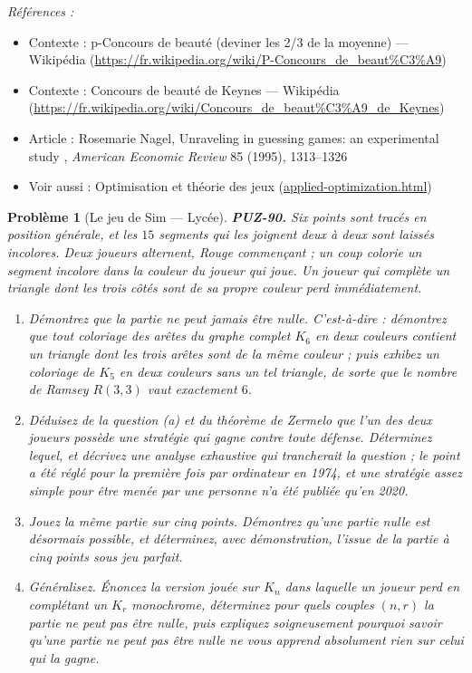 \documentclass[11pt]{article}
\newtheorem{problem}{Problème}
\newenvironment{refs}{\par\small\noindent\emph{Références :}\begin{itemize}\setlength\itemsep{0pt}}{\end{itemize}\normalsize}
\begin{document}
\begin{refs}
\item Contexte : p-Concours de beauté (deviner les 2/3 de la moyenne) --- Wikipédia (\url{https://fr.wikipedia.org/wiki/P-Concours_de_beaut%C3%A9})
\item Contexte : Concours de beauté de Keynes --- Wikipédia (\url{https://fr.wikipedia.org/wiki/Concours_de_beaut%C3%A9_de_Keynes})
\item Article : Rosemarie Nagel, \og{} Unraveling in guessing games: an experimental study \fg{}, \textit{American Economic Review} 85 (1995), 1313--1326
\item Voir aussi : Optimisation et théorie des jeux (\url{applied-optimization.html})
\end{refs}

\bigskip

\begin{problem}[{Le jeu de Sim --- Lycée}]
\textbf{PUZ-90.} Six points sont tracés en position générale, et les $ 15 $ segments
qui les joignent deux à deux sont laissés incolores. Deux joueurs alternent, Rouge
commençant ; un coup colorie un segment incolore dans la couleur du joueur qui joue. Un
joueur qui complète un triangle dont les trois côtés sont de sa propre couleur perd
immédiatement.
\begin{enumerate}
\item[(a)] Démontrez que la partie ne peut jamais être nulle. C'est-à-dire : démontrez que tout
coloriage des arêtes du graphe complet $ K_6 $ en deux couleurs contient un triangle dont
les trois arêtes sont de la même couleur ; puis exhibez un coloriage de $ K_5 $ en deux
couleurs sans un tel triangle, de sorte que le nombre de Ramsey $ R(3,3) $ vaut exactement
$ 6 $.
\item[(b)] Déduisez de la question (a) et du théorème de Zermelo que l'un des deux joueurs possède
une stratégie qui gagne contre toute défense. Déterminez lequel, et décrivez une analyse
exhaustive qui trancherait la question ; le point a été réglé pour la première fois par
ordinateur en 1974, et une stratégie assez simple pour être menée par une personne n'a été
publiée qu'en 2020.
\item[(c)] Jouez la même partie sur cinq points. Démontrez qu'une partie nulle est désormais
possible, et déterminez, avec démonstration, l'issue de la partie à cinq points sous jeu
parfait.
\item[(d)] Généralisez. Énoncez la version jouée sur $ K_n $ dans laquelle un joueur perd en
complétant un $ K_r $ monochrome, déterminez pour quels couples $ (n, r) $ la partie ne
peut pas être nulle, puis expliquez soigneusement pourquoi savoir qu'une partie ne peut pas
être nulle ne vous apprend absolument rien sur celui qui la gagne.
\end{enumerate}

\end{problem}
\end{document}
